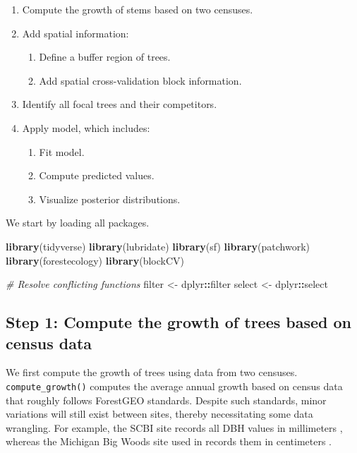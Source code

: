 \documentclass[12pt]{article}
\providecommand{\tightlist}{%
  \setlength{\itemsep}{0pt}\setlength{\parskip}{0pt}}
\newenvironment{Shaded}{\begin{snugshade}}{\end{snugshade}}
\newcommand{\CommentTok}[1]{\textcolor[rgb]{0.56,0.35,0.01}{\textit{#1}}}
\newcommand{\KeywordTok}[1]{\textcolor[rgb]{0.13,0.29,0.53}{\textbf{#1}}}
\newcommand{\NormalTok}[1]{#1}
\newcommand{\OperatorTok}[1]{\textcolor[rgb]{0.81,0.36,0.00}{\textbf{#1}}}
\newcommand{\StringTok}[1]{\textcolor[rgb]{0.31,0.60,0.02}{#1}}
\begin{document}
\begin{enumerate}
\def\labelenumi{\arabic{enumi}.}
\tightlist
\item
  Compute the growth of stems based on two censuses.
\item
  Add spatial information:

  \begin{enumerate}
  \def\labelenumii{\arabic{enumii}.}
  \tightlist
  \item
    Define a buffer region of trees.
  \item
    Add spatial cross-validation block information.
  \end{enumerate}
\item
  Identify all focal trees and their competitors.
\item
  Apply model, which includes:

  \begin{enumerate}
  \def\labelenumii{\arabic{enumii}.}
  \tightlist
  \item
    Fit model.
  \item
    Compute predicted values.
  \item
    Visualize posterior distributions.
  \end{enumerate}
\end{enumerate}

We start by loading all packages.

\begin{Shaded}
\begin{Highlighting}[]
\KeywordTok{library}\NormalTok{(tidyverse)}
\KeywordTok{library}\NormalTok{(lubridate)}
\KeywordTok{library}\NormalTok{(sf)}
\KeywordTok{library}\NormalTok{(patchwork)}
\KeywordTok{library}\NormalTok{(forestecology)}
\KeywordTok{library}\NormalTok{(blockCV)}

\CommentTok{# Resolve conflicting functions}
\NormalTok{filter <-}\StringTok{ }\NormalTok{dplyr}\OperatorTok{::}\NormalTok{filter}
\NormalTok{select <-}\StringTok{ }\NormalTok{dplyr}\OperatorTok{::}\NormalTok{select}
\end{Highlighting}
\end{Shaded}

\hypertarget{compute-growth}{%
\subsection{Step 1: Compute the growth of trees based on census
data}\label{compute-growth}}

We first compute the growth of trees using data from two censuses.
\texttt{compute\_growth()} computes the average annual growth based on
census data that roughly follows ForestGEO standards. Despite such
standards, minor variations will still exist between sites, thereby
necessitating some data wrangling. For example, the SCBI site records
all DBH values in millimeters \citep{bourg_initial_2013}, whereas the
Michigan Big Woods site used in \citet{allen_permutation_2020} records
them in centimeters \citep{allen_michigan_2020}.
\end{document}
